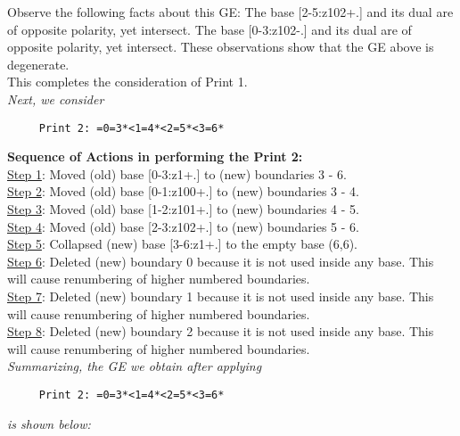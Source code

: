 \documentclass[final]{article}
\begin{document}
Observe the following facts about this GE:
The base [2-5:z102+.]  and its dual are of opposite polarity, yet intersect.  The base [0-3:z102-.]  and its dual are of opposite polarity, yet intersect.  These observations show that the GE above is degenerate.\\[0.1in]
This completes the consideration of Print 1.\\[0.1in]
{\em Next, we consider}
\begin{verbatim}
     Print 2: =0=3*<1=4*<2=5*<3=6*
\end{verbatim}
{\bf Sequence of Actions in performing the Print 2:}\\
{\underline{Step 1}:} Moved (old) base [0-3:z1+.]  to (new) boundaries 3 - 6.\\
{\underline{Step 2}:} Moved (old) base [0-1:z100+.]  to (new) boundaries 3 - 4.\\
{\underline{Step 3}:} Moved (old) base [1-2:z101+.]  to (new) boundaries 4 - 5.\\
{\underline{Step 4}:} Moved (old) base [2-3:z102+.]  to (new) boundaries 5 - 6.\\
{\underline{Step 5}:} Collapsed (new) base [3-6:z1+.]  to the empty base (6,6).
\\
{\underline{Step 6}:} Deleted (new) boundary 0 because it is not used inside any base.  This will cause renumbering of higher numbered boundaries.
\\
{\underline{Step 7}:} Deleted (new) boundary 1 because it is not used inside any base.  This will cause renumbering of higher numbered boundaries.
\\
{\underline{Step 8}:} Deleted (new) boundary 2 because it is not used inside any base.  This will cause renumbering of higher numbered boundaries.
\\[0.1in]
{\em Summarizing, the GE we obtain after applying}
\begin{verbatim}
     Print 2: =0=3*<1=4*<2=5*<3=6*
\end{verbatim}
{\em is shown below:}
\end{document}
